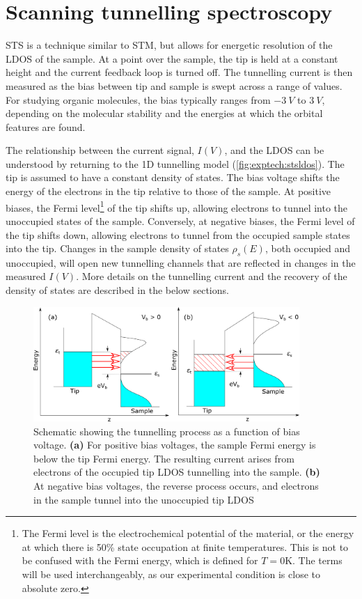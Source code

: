 \section{Scanning tunnelling spectroscopy}
\label{sec:exptech:sts}

\Acf{STS} is a technique similar to \ac{STM}, but allows for energetic resolution of the \ac{LDOS} of the sample. At a point over the sample, the tip is held at a constant height and the current feedback loop is turned off. The tunnelling current is then measured as the bias between tip and sample is swept across a range of values. For studying organic molecules, the bias typically ranges from $\SI{-3}{V}$ to $\SI{3}{V}$, depending on the molecular stability and the energies at which the orbital features are found.

The relationship between the current signal, $I(V)$, and the \ac{LDOS} can be understood by returning to the \ac{1D} tunnelling model (\autoref{fig:exptech:stsldos}). The tip is assumed to have a constant density of states. The bias voltage shifts the energy of the electrons in the tip relative to those of the sample. At positive biases, the Fermi level\footnote{The Fermi level is the electrochemical potential of the material, or the energy at which there is 50\% state occupation at finite temperatures. This is not to be confused with the Fermi energy, which is defined for $T=0$K. The terms will be used interchangeably, as our experimental condition is close to absolute zero.} of the tip shifts up, allowing electrons to tunnel into the unoccupied states of the sample. Conversely, at negative biases, the Fermi level of the tip shifts down, allowing electrons to tunnel from the occupied sample states into the tip. Changes in the sample density of states $\rho_s(E)$, both occupied and unoccupied, will open new tunnelling channels that are reflected in changes in the measured $I(V)$. More details on the tunnelling current and the recovery of the density of states are described in the below sections.

\begin{figure} [h]
    \centering
    \includegraphics[width=0.9\textwidth]{pictures/sts_ldos.png}
    \caption{Schematic showing the tunnelling process as a function of bias voltage. \textbf{(a)} For positive bias voltages, the sample Fermi energy is below the tip Fermi energy. The resulting current arises from electrons of the occupied tip LDOS tunnelling into the sample. \textbf{(b)} At negative bias voltages, the reverse process occurs, and electrons in the sample tunnel into the unoccupied tip LDOS}
    \label{fig:exptech:stsldos}
\end{figure}


